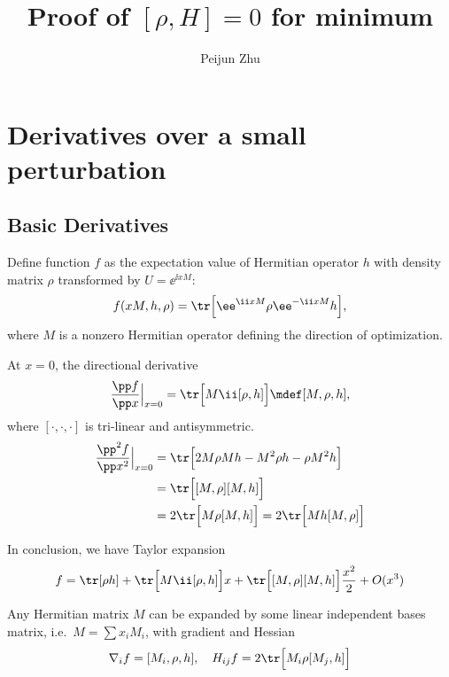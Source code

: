 \documentclass[10pt]{article}
\title{Proof of $[\rho, H]= 0$ for minimum}
\author{Peijun Zhu}
\begin{document}
\maketitle
\section{Derivatives over a small perturbation}
\subsection{Basic Derivatives}
Define function $f$ as the expectation value of Hermitian operator $h$ with density matrix $\rho$ transformed by $U=\ee^{\ii xM}$:
\begin{equation}
f(xM, h, \rho)=\tr \Big[\ee^{\ii xM}\rho \ee^{-\ii xM}h\Big],
\end{equation}
where $M$ is a nonzero Hermitian operator defining the direction of optimization. 

At $x=0$, the directional derivative
\[\frac{\pp f}{\pp x}\Big|_{x=0}=\tr \Big[M\ii [\rho, h]\Big]\mdef [M, \rho, h],\]
where $[\cdot, \cdot, \cdot]$ is tri-linear and antisymmetric.
\begin{align}
\frac{\pp^2 f}{\pp x^2}\Big|_{x=0}&=\tr \Big[2M\rho Mh-M^2\rho h-\rho M^2h\Big]\\
&=\tr \Big[[M,\rho][M, h]\Big]\\
&=2\tr \Big[M\rho [M, h]\Big]=2\tr \Big[Mh [M, \rho]\Big]
\end{align}

In conclusion, we have Taylor expansion
\[f= \tr[\rho h] + \tr\Big[M\ii[\rho, h]\Big]x + \tr \Big[[M,\rho][M, h]\Big]\frac{x^2}{2}+O(x^3) \]

Any Hermitian matrix $M$ can be expanded by some linear independent bases matrix, i.e.\ $M=\sum x_iM_i$, with gradient and Hessian 
\begin{equation}
\nabla_i f=[M_i,\rho, h], \quad H_{ij}f=2\tr \Big[M_i\rho[M_j, h]\Big]
\end{equation}
\end{document}
